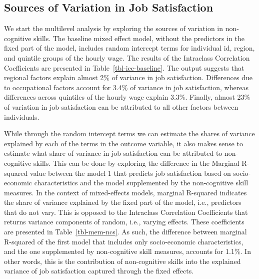 \documentclass[
]{interact}
\begin{document}
\subsection{Sources of Variation in Job
Satisfaction}\label{sources-of-variation-in-job-satisfaction}

We start the multilevel analysis by exploring the sources of variation
in non-cognitive skills. The baseline mixed effect model, without the
predictors in the fixed part of the model, includes random intercept
terms for individual id, region, and quintile groups of the hourly wage.
The results of the Intraclass Correlation Coefficients are presented in
Table~\ref{tbl-icc-baseline}. The output suggests that regional factors
explain almost 2\% of variance in job satisfaction. Differences due to
occupational factors account for 3.4\% of variance in job satisfaction,
whereas differences across quintiles of the hourly wage explain 3.3\%.
Finally, almost 23\% of variation in job satisfaction can be attributed
to all other factors between individuals.

While through the random intercept terms we can estimate the shares of
variance explained by each of the terms in the outcome variable, it also
makes sense to estimate what share of variance in job satisfaction can
be attributed to non-cognitive skills. This can be done by exploring the
difference in the Marginal R-squared value between the model 1 that
predicts job satisfaction based on socio-economic characteristics and
the model supplemented by the non-cognitive skill measures. In the
context of mixed-effects models, marginal R-squared indicates the share
of variance explained by the fixed part of the model, i.e., predictors
that do not vary. This is opposed to the Intraclass Correlation
Coefficients that returns variance components of random, i.e., varying
effects. These coefficients are presented in Table~\ref{tbl-mem-ncs}. As
such, the difference between marginal R-squared of the first model that
includes only socio-economic characteristics, and the one supplemented
by non-cognitive skill measures, accounts for 1.1\%. In other words,
this is the contribution of non-cognitive skills into the explained
variance of job satisfaction captured through the fixed effects.

\begin{table}

\caption{\label{tbl-icc-baseline}Intraclass Correlation Coefficients of
the Baseline Mixed-Effects Model, Job Satisfaction by the Random
Intercept Terms of Individual ID, Region, and Hourly Wage}


\end{table}%
\end{document}
